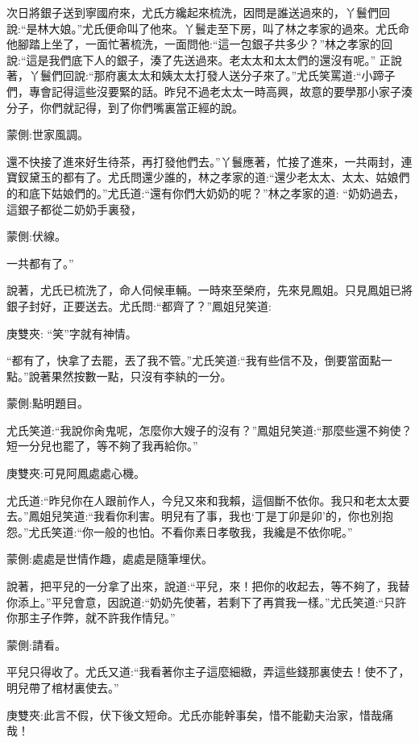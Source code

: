 \begin{parag}
    次日將銀子送到寧國府來，尤氏方纔起來梳洗，因問是誰送過來的，丫鬟們回說:“是林大娘。”尤氏便命叫了他來。丫鬟走至下房，叫了林之孝家的過來。尤氏命他腳踏上坐了，一面忙著梳洗，一面問他:“這一包銀子共多少？”林之孝家的回說:“這是我們底下人的銀子，湊了先送過來。老太太和太太們的還沒有呢。” 正說著，丫鬟們回說:“那府裏太太和姨太太打發人送分子來了。”尤氏笑罵道:“小蹄子們，專會記得這些沒要緊的話。昨兒不過老太太一時高興，故意的要學那小家子湊分子，你們就記得，到了你們嘴裏當正經的說。\begin{note}蒙側:世家風調。\end{note}還不快接了進來好生待茶，再打發他們去。”丫鬟應著，忙接了進來，一共兩封，連寶釵黛玉的都有了。尤氏問還少誰的，林之孝家的道:“還少老太太、太太、姑娘們的和底下姑娘們的。”尤氏道:“還有你們大奶奶的呢？”林之孝家的道: “奶奶過去，這銀子都從二奶奶手裏發，\begin{note}蒙側:伏線。\end{note}一共都有了。”
\end{parag}


\begin{parag}
    說著，尤氏已梳洗了，命人伺候車輛。一時來至榮府，先來見鳳姐。只見鳳姐已將銀子封好，正要送去。尤氏問:“都齊了？”鳳姐兒笑道:\begin{note}庚雙夾: “笑”字就有神情。\end{note}“都有了，快拿了去罷，丟了我不管。”尤氏笑道:“我有些信不及，倒要當面點一點。”說著果然按數一點，只沒有李紈的一分。\begin{note}蒙側:點明題目。\end{note}尤氏笑道:“我說你肏鬼呢，怎麼你大嫂子的沒有？”鳳姐兒笑道:“那麼些還不夠使？短一分兒也罷了，等不夠了我再給你。”\begin{note}庚雙夾:可見阿鳳處處心機。\end{note}尤氏道:“昨兒你在人跟前作人，今兒又來和我賴，這個斷不依你。我只和老太太要去。”鳳姐兒笑道:“我看你利害。明兒有了事，我也‘丁是丁卯是卯’的，你也別抱怨。”尤氏笑道:“你一般的也怕。不看你素日孝敬我，我纔是不依你呢。”\begin{note}蒙側:處處是世情作趣，處處是隨筆埋伏。\end{note}說著，把平兒的一分拿了出來，說道:“平兒，來！把你的收起去，等不夠了，我替你添上。”平兒會意，因說道:“奶奶先使著，若剩下了再賞我一樣。”尤氏笑道:“只許你那主子作弊，就不許我作情兒。”\begin{note}蒙側:請看。\end{note}平兒只得收了。尤氏又道:“我看著你主子這麼細緻，弄這些錢那裏使去！使不了，明兒帶了棺材裏使去。”\begin{note}庚雙夾:此言不假，伏下後文短命。尤氏亦能幹事矣，惜不能勸夫治家，惜哉痛哉！\end{note}
\end{parag}


